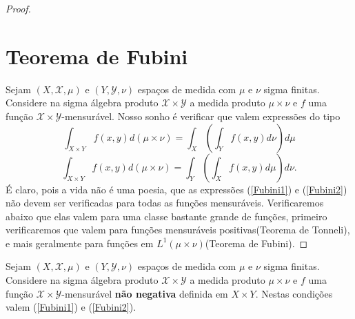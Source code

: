 \begin{proof}
\section{Teorema de Fubini}  
 Sejam $(X, \mathscr{X}, \mu)$ e $(Y, \mathscr{Y}, \nu)$
 espaços de medida com $\mu$ e $\nu$ sigma finitas. Considere na sigma álgebra
 produto $\mathscr{X}\times \mathscr{Y}$ a medida produto $\mu\times \nu$ e $f$ uma função $\mathscr{X}\times \mathscr{Y}$-mensurável. Nosso sonho 
 é verificar que valem expressões do tipo 
 \begin{equation}\label{Fubini1}
 \int_{X\times Y}f(x,y) d(\mu\times\nu)= \int_X(\int_Yf(x,y) d\nu)d\mu
 \end{equation}
 \begin{equation}\label{Fubini2}
 \int_{X\times Y}f(x,y) d(\mu\times \nu)=\int_Y(\int_Xf(x,y) d\mu)d\nu.
 \end{equation}
É claro, pois a vida não é uma poesia, que as expressões (\ref{Fubini1}) e (\ref{Fubini2}) não devem ser
verificadas para todas as funções mensuráveis. Verificaremos abaixo que elas valem para uma classe bastante 
grande de funções, primeiro verificaremos que valem para funções mensuráveis positivas(Teorema de Tonneli), e mais geralmente
para funções em $L^1(\mu\times \nu)$(Teorema de Fubini).
\end{proof}



\begin{teorema}[Tonelli]
Sejam $(X, \mathscr{X}, \mu)$ e $(Y, \mathscr{Y}, \nu)$
 espaços de medida com $\mu$ e $\nu$ sigma finitas. Considere na sigma álgebra
 produto $\mathscr{X}\times \mathscr{Y}$ a medida produto $\mu\times \nu$ e $f$ uma função $\mathscr{X}\times \mathscr{Y}$-mensurável \textbf{não negativa} definida em $X\times Y$. Nestas condições valem (\ref{Fubini1}) e (\ref{Fubini2}). 
\end{teorema}


